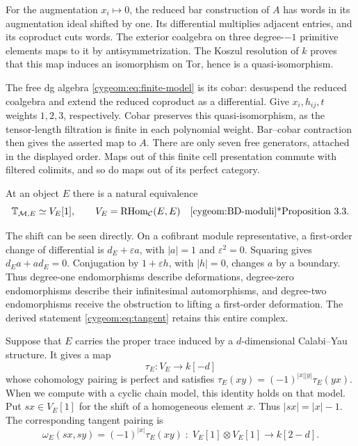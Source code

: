 For the augmentation $x_i\mapsto0$, the reduced bar construction of
$A$ has words in its augmentation ideal shifted by one. Its differential
multiplies adjacent entries, and its coproduct cuts words. The exterior
coalgebra on three degree-$-1$ primitive elements maps to it by
antisymmetrization. The Koszul
resolution of $k$ proves that this map induces an isomorphism on Tor,
hence is a quasi-isomorphism.

The free dg algebra
\eqref{cygeom:eq:finite-model} is its cobar: desuspend the reduced
coalgebra and extend the reduced coproduct as a differential.
Give $x_i,h_{ij},t$ weights $1,2,3$, respectively.
Cobar preserves this quasi-isomorphism, as the tensor-length filtration
is finite in each polynomial weight. Bar--cobar contraction then gives
the asserted map to $A$. There are only seven free generators, attached
in the displayed order. Maps out of this finite cell presentation commute
with filtered colimits, and so do maps out of its perfect category.

At an object $E$ there is a natural equivalence
\begin{equation}\label{cygeom:eq:tangent}
 \mathbb T_{\mathcal M,E}\simeq
 V_E[1],\qquad V_E=\operatorname{RHom}_{\mathcal C}(E,E)
 \quad\text{\cite{cygeom:BD-moduli}*{Proposition~3.3}}.
\end{equation}

The shift can be seen directly. On a cofibrant module representative,
a first-order change of differential is $d_E+\varepsilon a$, with
$|a|=1$ and $\varepsilon^2=0$. Squaring gives
$d_Ea+ad_E=0$. Conjugation by $1+\varepsilon h$, with $|h|=0$,
changes $a$ by a boundary. Thus degree-one endomorphisms describe
deformations, degree-zero endomorphisms describe their infinitesimal
automorphisms, and degree-two endomorphisms receive the obstruction to
lifting a first-order deformation. The derived statement
\eqref{cygeom:eq:tangent} retains this entire complex.

Suppose that $E$ carries the proper trace induced by a $d$-dimensional
Calabi--Yau structure. It gives a map
\[
 \tau_E:V_E\longrightarrow k[-d]
\]
whose cohomology pairing is perfect and satisfies
$\tau_E(xy)=(-1)^{|x||y|}\tau_E(yx)$.
When we compute with a cyclic chain model, this identity holds on that
model. Put $sx\in V_E[1]$
for the shift of a homogeneous element $x$. Thus $|sx|=|x|-1$.
The corresponding tangent pairing is
\begin{equation}\label{cygeom:eq:suspended-pairing}
 \omega_E(sx,sy)=(-1)^{|x|}\tau_E(xy)
       \;:\;V_E[1]\otimes V_E[1]\longrightarrow k[2-d].
\end{equation}

